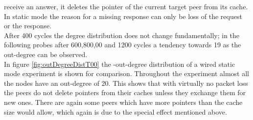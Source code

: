 receive an answer, it deletes the pointer of the current target peer from its
cache. In static mode the reason for a missing response can only be loss of the
request or the response.\\
After 400 cycles the degree distribution does not change fundamentally; in the
following probes after 600,800,00 and 1200 cycles a tendency towards 19 as the
out-degree can be observed.\\
In figure \ref{fig:outDegreeDistT00} the -out-degree distribution of a wired
static mode experiment is shown for comparison. Throughout the experiment almost
all the nodes have an out-degree of 20. This shows that with virtually no packet
loss the peers do not delete pointers from their caches unless they exchange
them for new ones. There are again some peers which have more pointers than the
cache size would allow, which again is due to the special effect mentioned
above.

